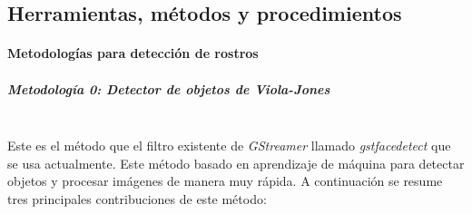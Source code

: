 \documentclass[a4paper,openright,12pt]{report}
\begin{document}
\subsection{Herramientas, métodos y procedimientos}

\paragraph{Metodologías para detección de rostros}
\subparagraph{Metodología 0: Detector de objetos de Viola-Jones}\mbox{} \\
Este es el método que el filtro existente de \textit{GStreamer} llamado
\textit{\gls{gstfacedetect}} que se usa actualmente. Este método basado en aprendizaje
de máquina para detectar objetos y procesar imágenes de manera muy rápida. A
continuación se resume tres principales contribuciones de este método:
\end{document}
